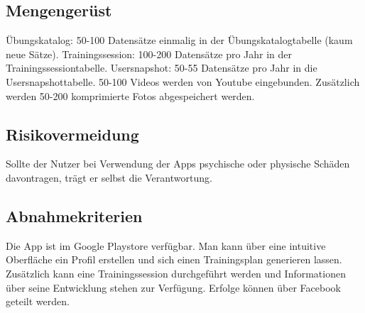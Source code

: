 \documentclass[FIPLY_base.tex]{subfiles}
\begin{document}
	\subsection{Mengengerüst}
	Übungskatalog: 50-100 Datensätze einmalig in der Übungskatalogtabelle (kaum neue Sätze).
	Trainingssession: 100-200 Datensätze pro Jahr in der Trainingssessiontabelle.
	Usersnapshot: 50-55 Datensätze pro Jahr in die Usersnapshottabelle.
	50-100 Videos werden von Youtube eingebunden.
	Zusätzlich werden 50-200 komprimierte Fotos abgespeichert werden.
	
	\subsection{Risikovermeidung}
	Sollte der Nutzer bei Verwendung der Apps psychische oder physische Schäden davontragen, trägt er selbst die Verantwortung.
	
	\subsection{Abnahmekriterien}
	Die App ist im Google Playstore verfügbar.
	Man kann über eine intuitive Oberfläche ein Profil erstellen und sich einen Trainingsplan generieren lassen. Zusätzlich kann eine Trainingssession durchgeführt werden und Informationen über seine Entwicklung stehen zur Verfügung.
	Erfolge können über Facebook geteilt werden.
	
\end{document}
